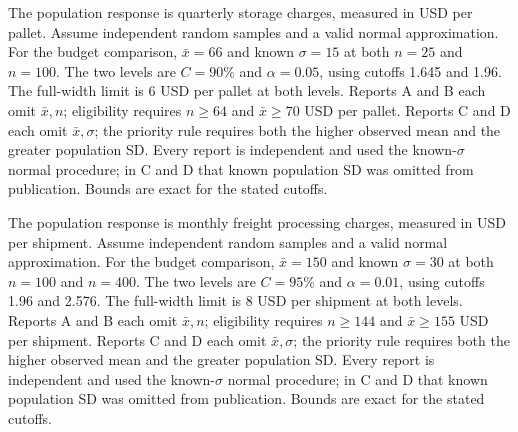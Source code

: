 The population response is quarterly storage charges, measured in USD per pallet. Assume independent random samples and a valid normal approximation. For the budget comparison, $\bar x=66$ and known $\sigma=15$ at both $n=25$ and $n=100$. The two levels are $C=90\%$ and $\alpha=0.05$, using cutoffs 1.645 and 1.96. The full-width limit is 6 USD per pallet at both levels.
Reports A and B each omit $\bar x,n$; eligibility requires $n\ge64$ and $\bar x\ge70$ USD per pallet. Reports C and D each omit $\bar x,\sigma$; the priority rule requires both the higher observed mean and the greater population SD. Every report is independent and used the known-$\sigma$ normal procedure; in C and D that known population SD was omitted from publication. Bounds are exact for the stated cutoffs.

The population response is monthly freight processing charges, measured in USD per shipment. Assume independent random samples and a valid normal approximation. For the budget comparison, $\bar x=150$ and known $\sigma=30$ at both $n=100$ and $n=400$. The two levels are $C=95\%$ and $\alpha=0.01$, using cutoffs 1.96 and 2.576. The full-width limit is 8 USD per shipment at both levels.
Reports A and B each omit $\bar x,n$; eligibility requires $n\ge144$ and $\bar x\ge155$ USD per shipment. Reports C and D each omit $\bar x,\sigma$; the priority rule requires both the higher observed mean and the greater population SD. Every report is independent and used the known-$\sigma$ normal procedure; in C and D that known population SD was omitted from publication. Bounds are exact for the stated cutoffs.


